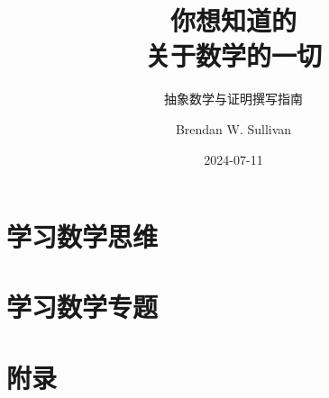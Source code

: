 \documentclass[lang=cn,color=green,12pt]{elegantbook}
\title{你想知道的\\关于数学的一切}
\subtitle{抽象数学与证明撰写指南}
\author{Brendan W. Sullivan}
\date{2024-07-11}
\begin{document}
\makecover


\frontmatter

\tableofcontents

\mainmatter

\part{学习数学思维}\label{part:Part One}








\part{学习数学专题}\label{part:Part Two}





\appendix

\part{附录}\label{part:Appendix}





\newpage

\makeunder
\end{document}
